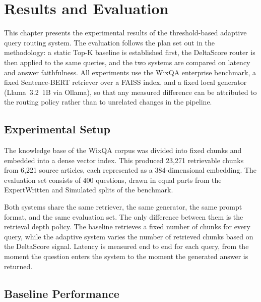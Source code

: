 \documentclass[12pt, a4paper, oneside]{report}
\begin{document}
\chapter{Results and Evaluation}

This chapter presents the experimental results of the threshold-based adaptive query routing system. The evaluation follows the plan set out in the methodology: a static Top-K baseline is established first, the DeltaScore router is then applied to the same queries, and the two systems are compared on latency and answer faithfulness. All experiments use the WixQA enterprise benchmark, a fixed Sentence-BERT retriever over a FAISS index, and a fixed local generator (Llama~3.2~1B via Ollama), so that any measured difference can be attributed to the routing policy rather than to unrelated changes in the pipeline.

\section{Experimental Setup}

The knowledge base of the WixQA corpus was divided into fixed chunks and embedded into a dense vector index. This produced 23{,}271 retrievable chunks from 6{,}221 source articles, each represented as a 384-dimensional embedding. The evaluation set consists of 400 questions, drawn in equal parts from the ExpertWritten and Simulated splits of the benchmark.

Both systems share the same retriever, the same generator, the same prompt format, and the same evaluation set. The only difference between them is the retrieval depth policy. The baseline retrieves a fixed number of chunks for every query, while the adaptive system varies the number of retrieved chunks based on the DeltaScore signal. Latency is measured end to end for each query, from the moment the question enters the system to the moment the generated answer is returned.

\section{Baseline Performance}
\end{document}
